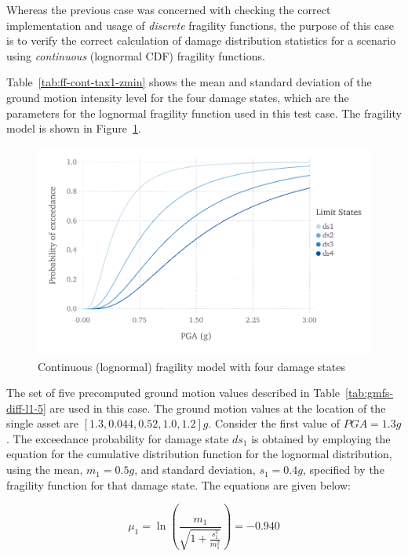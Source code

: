 Whereas the previous case was concerned with checking the correct implementation and usage of \emph{discrete} fragility functions, the purpose of this case is to verify the correct calculation of damage distribution statistics for a scenario using \emph{continuous} (lognormal CDF) fragility functions.



Table~\ref{tab:ff-cont-tax1-zmin} shows the mean and standard deviation of the ground motion intensity level for the four damage states, which are the parameters for the lognormal fragility function used in this test case. The fragility model is shown in Figure~\ref{fig:ff-cont-tax1-zmin}.

\begin{figure}[htbp]
\centering
\includegraphics[width=12cm]{qareport/figures/fig-ff-cont-tax1-zmin}
\caption{Continuous (lognormal) fragility model with four damage states}
\label{fig:ff-cont-tax1-zmin}
\end{figure}

The set of five precomputed ground motion values described in Table~\ref{tab:gmfs-diff-l1-5}  are used in this case. The ground motion values at the location of the single asset are $[1.3, 0.044, 0.52, 1.0, 1.2] g$. Consider the first value of $PGA = 1.3 g$. The exceedance probability for damage state $ds_1$ is obtained by employing the equation for the cumulative distribution function for the lognormal distribution, using the mean, $m_1 = 0.5 g$, and standard deviation, $s_1 = 0.4 g$, specified by the fragility function for that damage state. The equations are given below:

\begin{equation}
	\mu_1 = \ln \left( \frac{m_1}{\sqrt{1 + \frac{s_1^2}{m_1^2}}} \right) = -0.940
\end{equation}

